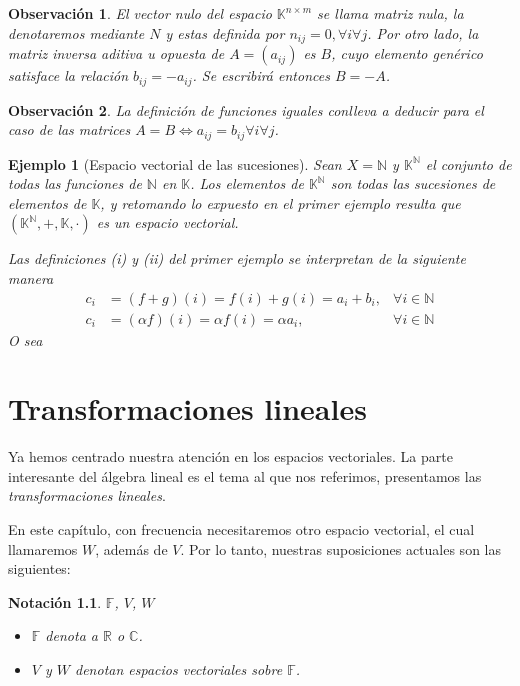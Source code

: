 \documentclass[b5paper, 11pt]{book}
\newcommand{\0}{\mathbf{0}}
\newcommand{\K}{\mathds{K}}
\newcommand{\N}{\mathds{N}}
\newtheorem{obs}{Observación}[chapter]
\theoremstyle{estiloB}
\newtheorem{ejemg}{Ejemplo}[chapter]
\theoremstyle{estiloC}
\theoremstyle{estiloD}
\newtheorem{notation}{Notación}[chapter]
\begin{document}
\begin{obs}
El vector nulo del espacio $\K^{n \times m}$ se llama matriz nula, la denotaremos mediante $N$ y estas definida por $n_{ij}=0, \forall i \forall j$. Por otro lado, la matriz inversa aditiva u opuesta de $A= (a_{ij})$ es $B$, cuyo elemento genérico satisface la relación $b_{ij}= -a_{ij}$. Se escribirá entonces $B= -A$.
\end{obs}

\begin{obs}
La definición de funciones iguales conlleva a deducir para el caso de las matrices $A=B \Longleftrightarrow a_{ij}= b_{ij} \forall i \forall j$.
\end{obs}

\begin{ejemg}[Espacio vectorial de las sucesiones]
Sean $X= \N$ y $\K^{\N}$ el conjunto de todas las funciones de $\N$ en $\K$. Los elementos de $\K^{\N}$ son todas las sucesiones de elementos de $\K$, y retomando lo expuesto en el primer ejemplo resulta que $(\K^{\N}, +, \K, \cdot)$ es un espacio vectorial.

Las definiciones \textit{(i)} y \textit{(ii)} del primer ejemplo se interpretan de la siguiente manera
\begin{align*}
c_i &= (f+g)(i)= f(i)+ g(i)= a_i + b_i, &\forall i \in \N\\
c_i &= (\alpha f)(i)= \alpha f(i)= \alpha a_i, &\forall i \in \N
\end{align*}
O sea
\end{ejemg}

\chapter{Transformaciones lineales}

Ya hemos centrado nuestra atención en los espacios vectoriales. La parte interesante del álgebra lineal es el tema al que nos referimos, presentamos las \emph{transformaciones lineales}.

En este capítulo, con frecuencia necesitaremos otro espacio vectorial, el cual llamaremos $W$, además de $V$. Por lo tanto, nuestras suposiciones actuales son las siguientes:

\begin{notation}{$\mathds{F}$, $V$, $W$}
\begin{itemize}
	\item $\mathds{F}$ denota a $\mathds{R}$ o $\mathds{C}$.
	\item $V$ y $W$ denotan espacios vectoriales sobre $\mathds{F}$.
\end{itemize}
\end{notation}
\end{document}
